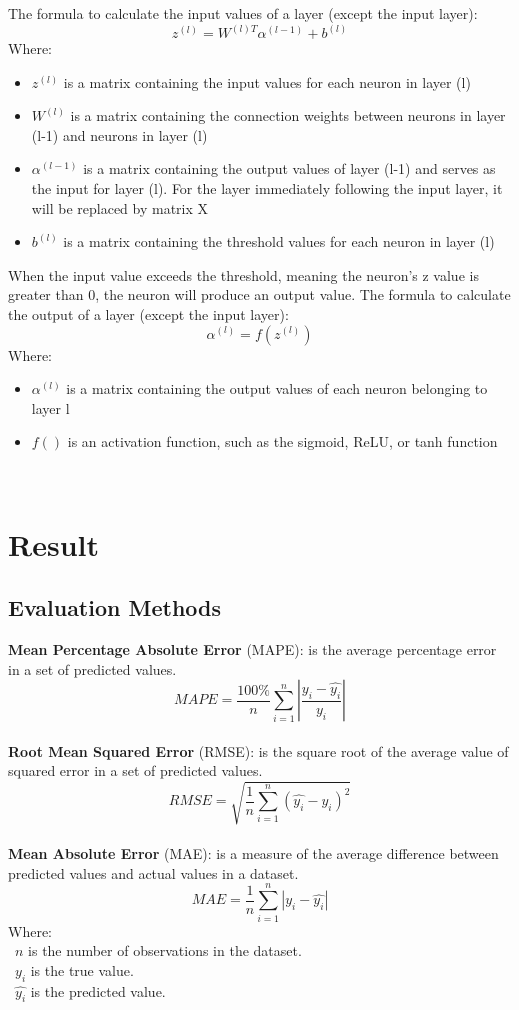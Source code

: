 \documentclass{ieeeojies}
\begin{document}
The formula to calculate the input values of a layer (except the input layer):
\[ z^{(l)} = W^{(l) T}\alpha^{(l-1)} + b^{(l)} \]
Where:
    \begin{itemize}
        \item $z^{(l)}$ is a matrix containing the input values for each neuron in layer (l)
        \item $W^{(l)}$ is a matrix containing the connection weights between neurons in layer (l-1) and neurons in layer (l)
        \item $\alpha^{(l-1)}$ is a matrix containing the output values of layer (l-1) and serves as the input for layer (l). For the layer immediately following the input layer, it will be replaced by matrix X
        \item $b^{(l)}$ is a matrix containing the threshold values for each neuron in layer (l)
    \end{itemize}
        
When the input value exceeds the threshold, meaning the neuron's z value is greater than 0, the neuron will produce an output value. The formula to calculate the output of a layer (except the input layer):
\[ \alpha^{(l)} = f(z^{(l)}) \]
Where:
    \begin{itemize}
        \item $\alpha^{(l)}$ is a matrix containing the output values of each neuron belonging to layer l
        \item  $f()$ is an activation function, such as the sigmoid, ReLU, or tanh function
    \end{itemize}\\
    
\section{Result}
\subsection{Evaluation Methods}
\textbf{Mean Percentage Absolute Error} (MAPE): is the average percentage error in a set of predicted values.\\
\[MAPE=\frac{100\%}{n}  \sum_{i=1}^{n} |\frac{y_i-\hat{y_i}}{y_i}|\]\\
\textbf{Root Mean Squared Error} (RMSE): is the square root of the average value of squared error in a set of predicted values.\\
\[RMSE=\sqrt{\frac{1}{n} \sum_{i=1}^{n}(\hat{y_i}-y_i )^2}\]\\
\textbf{Mean Absolute Error} (MAE): is a measure of the average difference between predicted values and actual values in a dataset.\\
\[MAE = \frac{1}{n} \sum_{i=1}^{n} |y_i - \hat{y_i}| \]
Where: \\
	\indent\textbullet\ \(n\) is the number of observations in the dataset.\\
	\indent\textbullet\ \(y_i\)  is the true value.\\
	\indent\textbullet\ \(\hat{y_i}\) is the predicted value.
        \cite{sefidian_guide}
\end{document}
